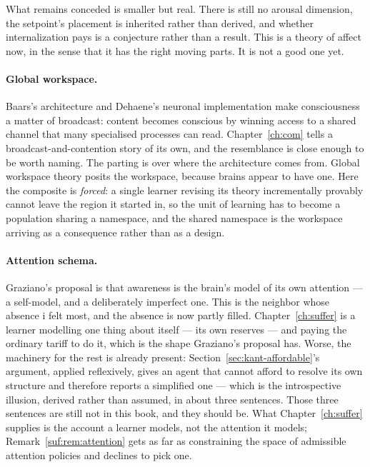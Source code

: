 What remains conceded is smaller but real.
There is still no arousal dimension, the setpoint's placement is
inherited rather than derived, and whether internalization pays is a
conjecture rather than a result.
This is a theory of affect now, in the sense that it has the right
moving parts.  It is not a good one yet.

\paragraph{Global workspace.}
Baars's architecture \cite{baars1988} and Dehaene's neuronal
implementation \cite{dehaene2011} make consciousness a matter of
broadcast: content becomes conscious by winning access to a shared
channel that many specialised processes can read.
Chapter~\ref{ch:com} tells a broadcast-and-contention story of its
own, and the resemblance is close enough to be worth naming.
The parting is over where the architecture comes from.
Global workspace theory posits the workspace, because brains appear
to have one.
Here the composite is \emph{forced}: a single learner revising its
theory incrementally provably cannot leave the region it started
in, so the unit of learning has to become a population sharing a
namespace, and the shared namespace is the workspace arriving as a
consequence rather than as a design.

\paragraph{Attention schema.}
Graziano's proposal \cite{graziano2013} is that awareness is the
brain's model of its own attention --- a self-model, and a
deliberately imperfect one.
This is the neighbor whose absence i felt most, and the absence is now
partly filled.
Chapter~\ref{ch:suffer} is a learner modelling one thing about itself
--- its own reserves --- and paying the ordinary tariff to do it, which
is the shape Graziano's proposal has.
Worse, the machinery for the rest is already present:
Section~\ref{sec:kant-affordable}'s argument, applied reflexively,
gives an agent that cannot afford to resolve its own structure and
therefore reports a simplified one --- which is the introspective
illusion, derived rather than assumed, in about three sentences.
Those three sentences are still not in this book, and they should be.
What Chapter~\ref{ch:suffer} supplies is the account a learner models,
not the attention it models; Remark~\ref{suf:rem:attention} gets as far
as constraining the space of admissible attention policies and declines
to pick one.

